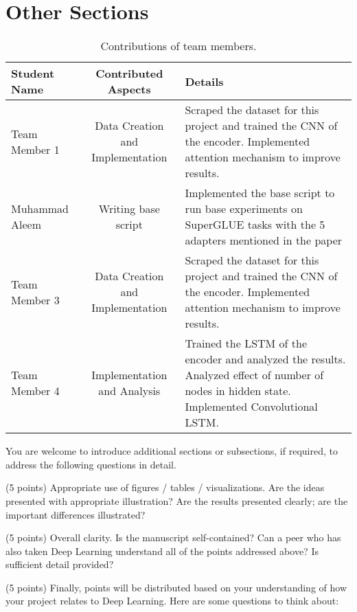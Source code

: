 \documentclass[10pt,twocolumn,letterpaper]{article}
\begin{document}
\section{Other Sections}

\begin{table*}
\begin{center}
\begin{tabular}{|l|c|p{8cm}|}
\hline
Student Name & Contributed Aspects & Details \\
\hline\hline
Team Member 1 & Data Creation and Implementation & Scraped the dataset for this project and trained the CNN of the encoder. Implemented attention mechanism to improve results. \\
Muhammad Aleem & Writing base script &Implemented the base script to run base experiments on SuperGLUE tasks with the 5 adapters mentioned in the paper \\
Team Member 3 & Data Creation and Implementation & Scraped the dataset for this project and trained the CNN of the encoder. Implemented attention mechanism to improve results. \\
Team Member 4 & Implementation and Analysis & Trained the LSTM of the encoder and analyzed the results. Analyzed effect of number of nodes in hidden state.  Implemented Convolutional LSTM. \\
\hline
\end{tabular}
\end{center}
\caption{Contributions of team members.}
\label{tab:contributions}
\end{table*}



You are welcome to introduce additional sections or subsections, if required, to address the following questions in detail. 

(5 points) Appropriate use of figures / tables / visualizations. Are the ideas presented with appropriate illustration? Are the results presented clearly; are the important differences illustrated? 

(5 points) Overall clarity. Is the manuscript self-contained? Can a peer who has also taken Deep Learning understand all of the points addressed above? Is sufficient detail provided? 

(5 points) Finally, points will be distributed based on your understanding of how your project relates to Deep Learning. Here are some questions to think about: 
\end{document}
